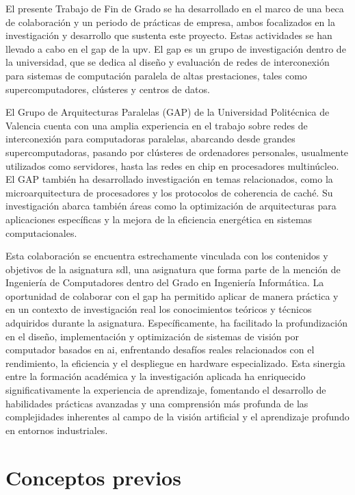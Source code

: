 \documentclass[11pt,spanish,listoffigures,listoftables]{tfgetsinf}
\begin{document}
El presente Trabajo de Fin de Grado se ha desarrollado en el marco de una beca de colaboración y un periodo de prácticas de empresa, ambos focalizados en la investigación y desarrollo que sustenta este proyecto. Estas actividades se han llevado a cabo en el \gls{gap} de la \gls{upv}. El \gls{gap} es un grupo de investigación dentro de la universidad, que se dedica al diseño y evaluación de redes de interconexión para sistemas de computación paralela de altas prestaciones, tales como supercomputadores, clústeres y centros de datos.

El Grupo de Arquitecturas Paralelas (GAP) de la Universidad Politécnica de Valencia cuenta con una amplia experiencia en el trabajo sobre redes de interconexión para computadoras paralelas, abarcando desde grandes supercomputadoras, pasando por clústeres de ordenadores personales, usualmente utilizados como servidores, hasta las redes en chip en procesadores multinúcleo. El GAP también ha desarrollado investigación en temas relacionados, como la microarquitectura de procesadores y los protocolos de coherencia de caché. Su investigación abarca también áreas como la optimización de arquitecturas para aplicaciones específicas y la mejora de la eficiencia energética en sistemas computacionales.

Esta colaboración se encuentra estrechamente vinculada con los contenidos y objetivos de la asignatura \gls{sdl}, una asignatura que forma parte de la mención de Ingeniería de Computadores dentro del Grado en Ingeniería Informática. La oportunidad de colaborar con el \gls{gap} ha permitido aplicar de manera práctica y en un contexto de investigación real los conocimientos teóricos y técnicos adquiridos durante la asignatura. Específicamente, ha facilitado la profundización en el diseño, implementación y optimización de sistemas de visión por computador basados en \gls{ai}, enfrentando desafíos reales relacionados con el rendimiento, la eficiencia y el despliegue en hardware especializado. Esta sinergia entre la formación académica y la investigación aplicada ha enriquecido significativamente la experiencia de aprendizaje, fomentando el desarrollo de habilidades prácticas avanzadas y una comprensión más profunda de las complejidades inherentes al campo de la visión artificial y el aprendizaje profundo en entornos industriales.


\chapter{Conceptos previos}\label{chap:conceptos_previos}
\end{document}
